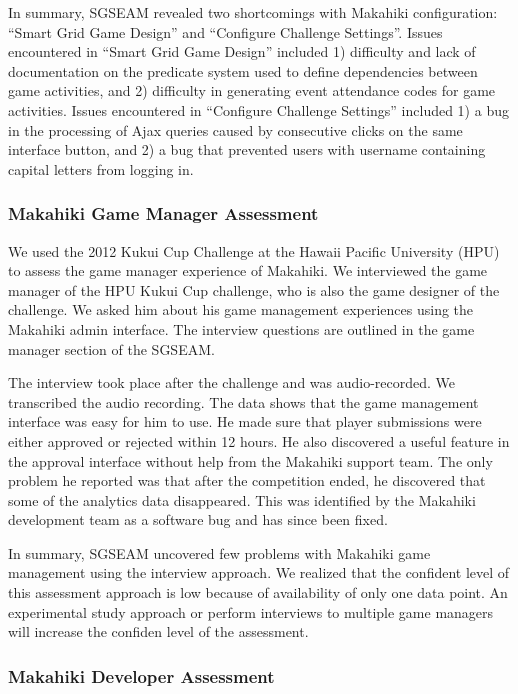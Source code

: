 \documentclass{sigchi}
\begin{document}
In summary, SGSEAM revealed two shortcomings with Makahiki configuration: ``Smart
Grid Game Design'' and ``Configure Challenge Settings''. Issues encountered in ``Smart Grid Game
Design'' included 1) difficulty and  lack of documentation on the predicate system used to define dependencies
between game activities, and 2) difficulty in generating event attendance codes for game activities.
Issues encountered in ``Configure Challenge Settings'' included 1) a bug in the processing of Ajax queries
caused by consecutive clicks on the same interface button, and 2) a bug that prevented users with username
containing capital letters from logging in.

\subsubsection{Makahiki Game Manager Assessment}

We used the 2012 Kukui Cup Challenge at the Hawaii Pacific University (HPU) to assess
the game manager experience of Makahiki. We interviewed the
game manager of the HPU Kukui Cup challenge, who is also the game designer of the challenge.
We asked him about his game management experiences using the Makahiki admin
interface. The interview questions are outlined in the game manager section of the SGSEAM.

The interview took place after the challenge and was audio-recorded. We transcribed the
audio recording. The data shows that the game management interface was easy for him to use.
He made sure that player submissions were either approved or rejected
within 12 hours. He also discovered a useful feature in the approval interface without
help from the Makahiki support team. The only problem he reported was that after the
competition ended, he discovered that some of the analytics data disappeared. This was
identified by the Makahiki development team as a software bug and has since been fixed.

In summary, SGSEAM uncovered few problems with Makahiki game management using the interview
approach. We realized that the confident level of this assessment approach is low because of
 availability of only one data point. An experimental study approach or perform interviews to
multiple game managers will increase the confiden level of the assessment.

\subsubsection{Makahiki Developer Assessment}
\end{document}
